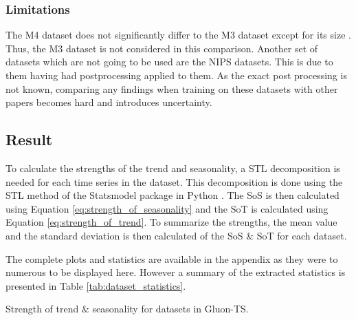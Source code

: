 \subsubsection{Limitations}
The M4 dataset does not significantly differ to the M3 dataset except for its size \cite{m3_vs_M4}. Thus, the M3 dataset is not considered in this comparison. Another set of datasets which are not going to be used are the NIPS datasets. This is due to them having had postprocessing applied to them. As the exact post processing is not known, comparing any findings when training on these datasets with other papers becomes hard and introduces uncertainty.

\subsection{Result}
To calculate the strengths of the trend and seasonality, a STL decomposition is needed for each time series in the dataset. This decomposition is done using the STL method of the Statsmodel package in Python \cite{seabold2010statsmodels}. The SoS is then calculated using Equation \ref{eq:strength_of_seasonality} and the SoT is calculated using Equation \ref{eq:strength_of_trend}. To summarize the strengths, the mean value and the standard deviation is then calculated of the SoS \& SoT for each dataset.

The complete plots and statistics are available in the appendix as they were to numerous to be displayed here. However a summary of the extracted statistics is presented in Table \ref{tab:dataset_statistics}.


\begin{table}[h]
  \caption{Strength of trend \& seasonality for datasets in Gluon-TS.}
  \label{heatmap_strengths}
\end{table}

